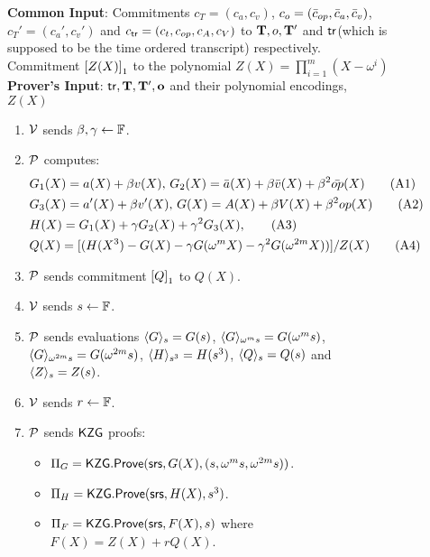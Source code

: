 \begin{figure}[htbp]

    \begin{mdframed}
    {
            {\bf Common Input}: Commitments $c_T=(c_a,c_v)$, $c_o=(\bar{c}_\op, \bar{c}_a, \bar{c}_v)$, $c_T'=(c_a', c_v')$
        and $c_\tr=(c_t, c_\op, c_A, c_V)$ to $\vecT,o,\vecT'$ and $\tr$(which is supposed to be the time ordered transcript) respectively. Commitment $\gone{Z(X)}$ to the polynomial
        $Z(X)=\prod_{i=1}^m (X-\omega^i)$\\
    {\bf Prover's Input}: $\tr, \vecT, \vecT', \vec{o}$ and their polynomial encodings, $Z(X)$
        \begin{enumerate}[leftmargin=1em, label=\arabic*.]
            \item $\verifier$ sends $\beta,\gamma\gets \F$.
            \item $\prover$ computes:
            \begin{align}\label{eq:poly-constraints}
            & G_1(X) = a(X) + \beta v(X),\, G_2(X) = \bar{a}(X) + \beta \bar{v}(X) + \beta^2 \bar{\op}(X) \tag{A1} \\
            & G_3(X) = a'(X) + \beta v'(X),\, G(X) = A(X) + \beta V(X) + \beta^2 \op(X) \tag{A2} \\
            & H(X) = G_1(X) + \gamma G_2(X) + \gamma^2 G_3(X), \tag{A3} \\
            & Q(X) = [(H(X^3) - G(X) - \gamma G(\omega^m X) - \gamma^2 G(\omega^{2m} X))]/Z(X) \tag{A4}
            \end{align}
            \item $\prover$ sends commitment $\gone{Q}$ to $Q(X)$.
            \item $\verifier$ sends $s\gets\F$.
            \item $\prover$ sends evaluations $\val{s}{G}=G(s)$, $\val{\omega^m s}{G}=G(\omega^m s)$,
            $\val{\omega^{2m}s}{G}=G(\omega^{2m} s)$, $\val{s^3}{H}=H(s^3)$, $\val{s}{Q}=Q(s)$ and $\val{s}{Z}=Z(s)$.
            \item $\verifier$ sends $r\gets\F$.
            \item $\prover$ sends $\kzg$ proofs:
            \begin{itemize}[leftmargin=1em]
                \item $\Pi_G=\kzgprove(\srs,G(X),(s,\omega^m s, \omega^{2m}s))$.
                \item $\Pi_H=\kzgprove(\srs,H(X),s^3)$.
                \item $\Pi_F=\kzgprove(\srs,F(X),s)$ where $F(X)=Z(X) + rQ(X)$.

\end{itemize}
\end{enumerate}}
\end{mdframed}
\end{figure}
